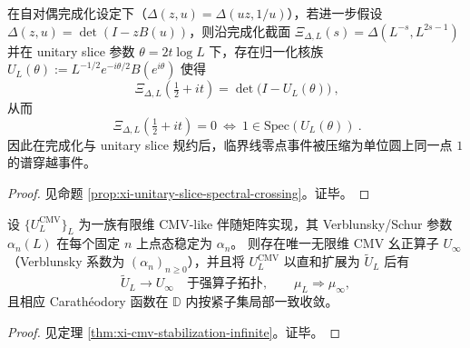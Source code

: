 \begin{theorem}\label{thm:discussion-critical-line-single-point-crossing}
在自对偶完成化设定下（\(\Delta(z,u)=\Delta(uz,1/u)\)），若进一步假设 \(\Delta(z,u)=\det(I-zB(u))\)，则沿完成化截面
\(
\Xi_{\Delta,L}(s)=\Delta(L^{-s},L^{2s-1})
\)
并在 unitary slice 参数 \(\theta=2t\log L\) 下，存在归一化核族
\(
U_L(\theta):=L^{-1/2}e^{-i\theta/2}B(e^{i\theta})
\)
使得
\[
\boxed{\ \Xi_{\Delta,L}\!\left(\tfrac12+it\right)=\det\!\bigl(I-U_L(\theta)\bigr)\ },
\]
从而
\[
\boxed{\ \Xi_{\Delta,L}\!\left(\tfrac12+it\right)=0\ \Longleftrightarrow\ 1\in\mathrm{Spec}(U_L(\theta))\ }.
\]
因此在完成化与 unitary slice 规约后，临界线零点事件被压缩为单位圆上同一点 \(1\) 的谱穿越事件。
\end{theorem}

\begin{proof}
见命题 \ref{prop:xi-unitary-slice-spectral-crossing}。证毕。
\end{proof}

\begin{theorem}[有限 CMV 证书的点态稳定化 \texorpdfstring{$\Rightarrow$}{=>} 无限维 CMV 幺正谱实现]\label{thm:discussion-cmv-stabilization-core}
设 \(\{U_L^{\mathrm{CMV}}\}_L\) 为一族有限维 CMV-like 伴随矩阵实现，其 Verblunsky/Schur 参数 \(\alpha_n(L)\) 在每个固定 \(n\) 上点态稳定为 \(\alpha_n\)。
则存在唯一无限维 CMV 幺正算子 \(U_\infty\)（Verblunsky 系数为 \((\alpha_n)_{n\ge 0}\)），并且将 \(U_L^{\mathrm{CMV}}\) 以直和扩展为 \(\widetilde U_L\) 后有
\[
\widetilde U_L\to U_\infty\quad\text{于强算子拓扑},
\qquad
\mu_L\Rightarrow \mu_\infty,
\]
且相应 Carath\'eodory 函数在 \(\mathbb{D}\) 内按紧子集局部一致收敛。
\end{theorem}

\begin{proof}
见定理 \ref{thm:xi-cmv-stabilization-infinite}。证毕。
\end{proof}

